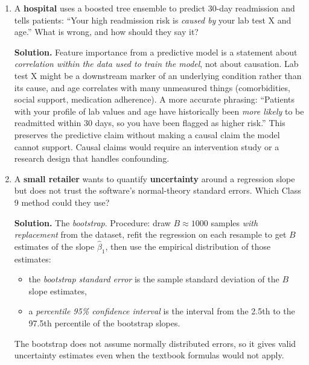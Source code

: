 \documentclass[11pt]{article}
\newcommand{\solution}[1]{%
  \par\medskip\noindent\textbf{Solution.} #1\par\medskip
}
\begin{document}
\begin{enumerate}[leftmargin=*]
\solution{The boosted tree ensemble (or random forest) will almost certainly win. Neural networks typically need thousands to millions of observations before their flexibility pays off; with 400 observations, a large network has too many parameters and overfits badly. Tree-based methods are highly competitive on small-to-medium tabular datasets and have well-understood regularization knobs.\\
If the startup insists on a neural net, they should: (i) keep the network small (1--2 hidden layers, modest width), (ii) use strong regularization (dropout, $\ell_2$ weight decay), (iii) employ early stopping against a validation set, (iv) standardize features, and (v) where possible, use \emph{transfer learning} from a model pre-trained on related data so they are not starting from scratch.}

\item A \textbf{hospital} uses a boosted tree ensemble to predict 30-day readmission and tells patients: ``Your high readmission risk is \emph{caused by} your lab test X and age.'' What is wrong, and how should they say it?

\solution{Feature importance from a predictive model is a statement about \emph{correlation within the data used to train the model}, not about causation. Lab test X might be a downstream marker of an underlying condition rather than its cause, and age correlates with many unmeasured things (comorbidities, social support, medication adherence). A more accurate phrasing: ``Patients with your profile of lab values and age have historically been \emph{more likely} to be readmitted within 30 days, so you have been flagged as higher risk.'' This preserves the predictive claim without making a causal claim the model cannot support. Causal claims would require an intervention study or a research design that handles confounding.}

\item A \textbf{small retailer} wants to quantify \textbf{uncertainty} around a regression slope but does not trust the software's normal-theory standard errors. Which Class 9 method could they use?

\solution{The \emph{bootstrap}. Procedure: draw $B \approx 1000$ samples \emph{with replacement} from the dataset, refit the regression on each resample to get $B$ estimates of the slope $\hat\beta_1$, then use the empirical distribution of those estimates:
\begin{itemize}
\item the \emph{bootstrap standard error} is the sample standard deviation of the $B$ slope estimates,
\item a \emph{percentile 95\% confidence interval} is the interval from the 2.5th to the 97.5th percentile of the bootstrap slopes.
\end{itemize}
The bootstrap does not assume normally distributed errors, so it gives valid uncertainty estimates even when the textbook formulas would not apply.}


\end{enumerate}
\end{document}
